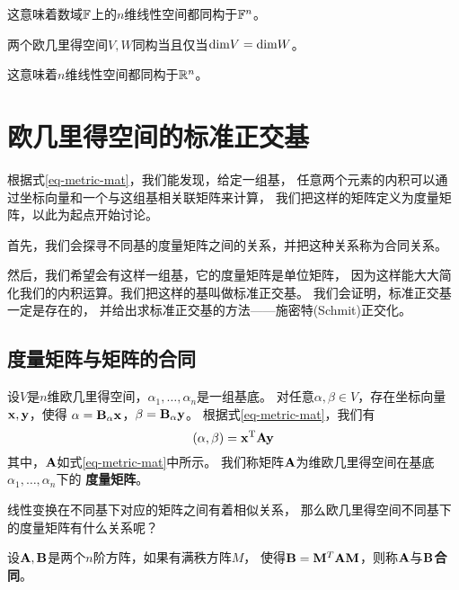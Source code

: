 \begin{remark}
  这意味着数域$\mathbb{F}$上的$n$维线性空间都同构于$\mathbb{F}^n$。
\end{remark}

\begin{theorem}[欧几里得空间同构的充要条件]
  两个欧几里得空间$V,W$同构当且仅当$\textrm{dim} V = \textrm{dim} W$。
\end{theorem}

\begin{remark}
  这意味着$n$维线性空间都同构于$\mathbb{R}^n$。
\end{remark}

\section{欧几里得空间的标准正交基}
根据式\ref{eq-metric-mat}，我们能发现，给定一组基，
任意两个元素的内积可以通过坐标向量和一个与这组基相关联矩阵来计算，
我们把这样的矩阵定义为度量矩阵，以此为起点开始讨论。

首先，我们会探寻不同基的度量矩阵之间的关系，并把这种关系称为合同关系。

然后，我们希望会有这样一组基，它的度量矩阵是单位矩阵，
因为这样能大大简化我们的内积运算。我们把这样的基叫做标准正交基。
我们会证明，标准正交基一定是存在的，
并给出求标准正交基的方法——施密特(Schmit)正交化。

\subsection{度量矩阵与矩阵的合同}
\begin{definition}[度量矩阵]
  设$V$是$n$维欧几里得空间，$\alpha_1,\dots,\alpha_n$是一组基底。
  对任意$\alpha,\beta\in V$，存在坐标向量$\mathbf{x},\mathbf{y}$，使得
  $\alpha=\mathbf{B}_{\alpha}\mathbf{x}$，$\beta=\mathbf{B}_{\alpha}\mathbf{y}$。
  根据式\ref{eq-metric-mat}，我们有
  \begin{displaymath}
    (\alpha,\beta) = \mathbf{x}^{\textrm{T}}\mathbf{A}\mathbf{y}
  \end{displaymath}
  其中，$\mathbf{A}$如式\ref{eq-metric-mat}中所示。
  我们称矩阵$\mathbf{A}$为维欧几里得空间在基底$\alpha_1,\dots,\alpha_n$下的
  \textbf{度量矩阵}。
\end{definition}

线性变换在不同基下对应的矩阵之间有着相似关系，
那么欧几里得空间不同基下的度量矩阵有什么关系呢？

\begin{definition}[矩阵的合同]
  设$\mathbf{A},\mathbf{B}$是两个$n$阶方阵，如果有满秩方阵$M$，
  使得$\mathbf{B}=\mathbf{M}^T\mathbf{A}\mathbf{M}$，则称$\mathbf{A}$与$\mathbf{B}$\textbf{合同}。
\end{definition}

